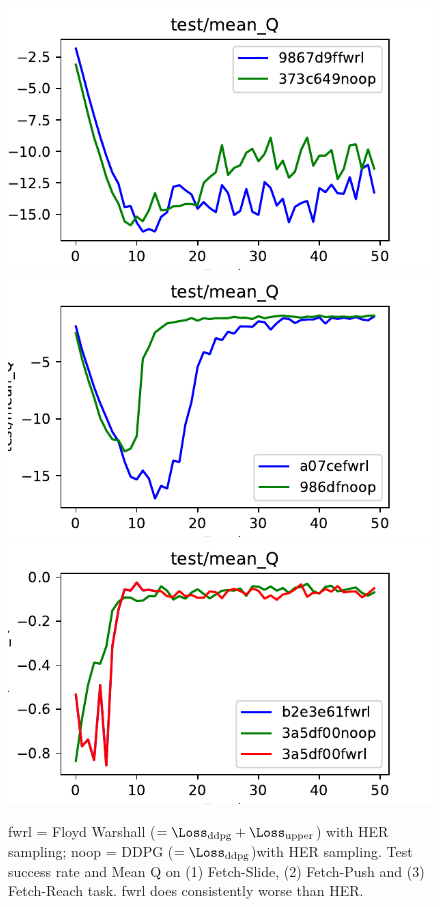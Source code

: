 \begin{figure}
    \includegraphics[width=\frac\columnwidth]{media/res/373c649_FetchSlide-v1-noop/test/mean_Q.pdf}%
    \includegraphics[width=\frac\columnwidth]{media/res/a077c9e_FetchPush-v1-fwrl/test/mean_Q.pdf}%
    \includegraphics[width=\frac\columnwidth]{media/res/3a5df00_FetchReach-v1-fwrl/test/mean_Q.pdf}
    \caption{fwrl = Floyd Warshall ($=\Loss_{\text{ddpg}} +
      \Loss_{\text{upper}}$) with HER sampling;
      noop = DDPG ($=\Loss_{\text{ddpg}}$)with HER sampling.
  Test success rate and Mean Q on (1) Fetch-Slide, (2) Fetch-Push and (3)
  Fetch-Reach task. fwrl does consistently worse than HER.}
    \label{fig:fetch-slide-success}
\end{figure}


